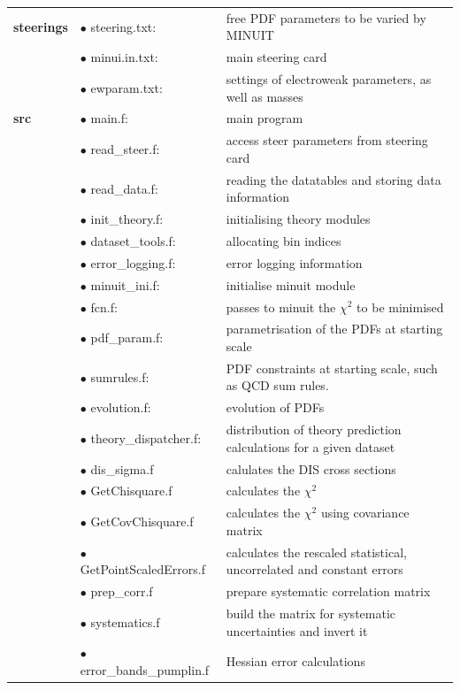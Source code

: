 \begin{center}
\begin{table}
\begin{tabular}{lp{4cm}p{10cm}}
\hline
\hline
\small\bf{steerings} & $\bullet$ steering.txt:& free PDF parameters to be varied by MINUIT \\
 & $\bullet$ minui.in.txt:& main steering card \\
 & $\bullet$ ewparam.txt:& settings of electroweak parameters, as well as masses \\
\toprule
\bf{src} & $\bullet$ main.f:& main program \\
& $\bullet$ read\_steer.f: &access steer parameters from steering card \\
& $\bullet$ read\_data.f: & reading the datatables and storing data information \\
& $\bullet$ init\_theory.f: & initialising theory modules \\
& $\bullet$ dataset\_tools.f:&  allocating bin indices \\
& $\bullet$ error\_logging.f: &  error logging information\\
& $\bullet$ minuit\_ini.f: & initialise minuit module \\
& $\bullet$ fcn.f: & passes to minuit the $\chi^2$ to be minimised \\
& $\bullet$ pdf\_param.f:  &  parametrisation of the PDFs at starting scale\\
& $\bullet$ sumrules.f: & PDF constraints at starting scale, such as QCD sum rules. \\
& $\bullet$ evolution.f: & evolution of PDFs \\
& $\bullet$ theory\_dispatcher.f: & distribution of theory prediction calculations for a given dataset  \\
& $\bullet$ dis\_sigma.f & calulates the DIS cross sections \\
& $\bullet$ GetChisquare.f & calculates the $\chi^2$  \\
& $\bullet$ GetCovChisquare.f & calculates the $\chi^2$ using covariance matrix \\
& $\bullet$ GetPointScaledErrors.f & calculates the rescaled statistical, uncorrelated and constant errors \\
& $\bullet$ prep\_corr.f & prepare systematic correlation matrix \\
& $\bullet$ systematics.f & build the matrix for systematic uncertainties and invert it \\
& $\bullet$ error\_bands\_pumplin.f  & Hessian error calculations  \\

\end{tabular}
\end{table}
\end{center}
